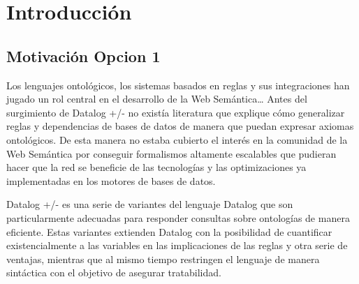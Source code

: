 \documentclass[11pt,a4paper,twoside]{tesis}
\theoremstyle{definition}
\begin{document}

\def\autor{Pablo Víctor Fromer}
\def\tituloTesis{Datalog +/-, \vspace{.2cm} \\ una interfaz tolerante a la inconsistencia }
\def\runtitulo{Datalog +/-, una interfaz tolerante a la inconsistencia}
\def\runtitle{Datalog +/-, una interfaz tolerante a la inconsistencia}
\def\director{Vanina Martinez}
\def\codirector{Ricardo Rodriguez}
\def\lugar{Buenos Aires, 2019}


%




\cleardoublepage
\tableofcontents

\mainmatter
\pagestyle{headings}


\chapter{Introducción}
\section{Motivación Opcion 1}

Los lenguajes ontológicos, los sistemas basados en reglas y sus integraciones han jugado un rol central en el desarrollo de la Web Semántica…  Antes del surgimiento de Datalog +/- no existía literatura que explique cómo generalizar reglas y dependencias de bases de datos de manera que puedan expresar axiomas ontológicos. De esta manera no estaba cubierto el interés en la comunidad de la Web Semántica por conseguir formalismos altamente escalables que pudieran hacer que la red se beneficie de las tecnologías y las optimizaciones ya implementadas en los motores de bases de datos.

Datalog +/- es una serie de variantes del lenguaje Datalog que son particularmente adecuadas para responder consultas sobre ontologías de manera eficiente. Estas variantes extienden Datalog con la posibilidad de cuantificar existencialmente a las variables en las implicaciones de las reglas y otra serie de ventajas, mientras que al mismo tiempo restringen el lenguaje de manera sintáctica con el objetivo de asegurar tratabilidad.
\end{document}
